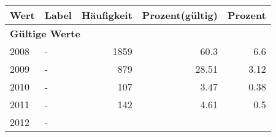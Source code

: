      \begin{longtable}{lXrrr}
     \toprule
     \textbf{Wert} & \textbf{Label} & \textbf{Häufigkeit} & \textbf{Prozent(gültig)} & \textbf{Prozent} \\
     \endhead
     \midrule
     \multicolumn{5}{l}{\textbf{Gültige Werte}}\\

     2008 &
     \multicolumn{1}{X}{ -  } &


       \num{1859} &
       \num[round-mode=places,round-precision=2]{60,3} &
         \num[round-mode=places,round-precision=2]{6,6} \\

     2009 &
     \multicolumn{1}{X}{ -  } &


       \num{879} &
       \num[round-mode=places,round-precision=2]{28,51} &
         \num[round-mode=places,round-precision=2]{3,12} \\

     2010 &
     \multicolumn{1}{X}{ -  } &


       \num{107} &
       \num[round-mode=places,round-precision=2]{3,47} &
         \num[round-mode=places,round-precision=2]{0,38} \\

     2011 &
     \multicolumn{1}{X}{ -  } &


       \num{142} &
       \num[round-mode=places,round-precision=2]{4,61} &
         \num[round-mode=places,round-precision=2]{0,5} \\

     2012 &
     \multicolumn{1}{X}{ -  } &



\end{longtable}
